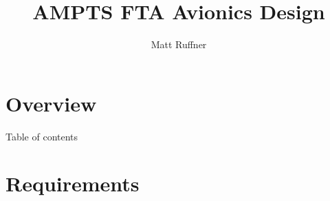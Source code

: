\documentclass[UKenglish]{beamer}
\author{Matt Ruffner}
\title{AMPTS FTA Avionics Design}
\begin{document}
\section{Overview}
%
%
\begin{frame}{Table of contents}
    \tableofcontents[currentsection]
\end{frame}

\section{Requirements}
\label{sec:requirements}
\hidelogo
\end{document}
